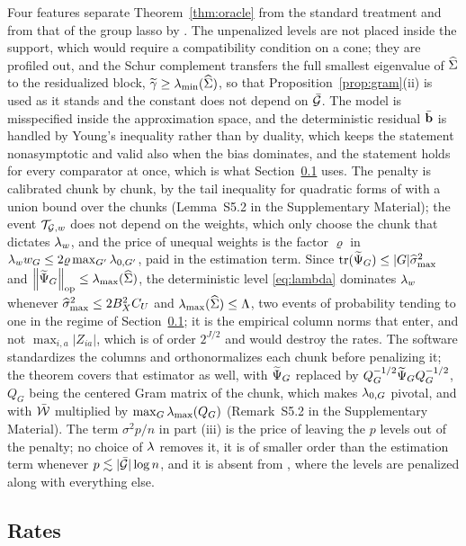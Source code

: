 Four features separate Theorem~\ref{thm:oracle} from the standard treatment
\citep[Chapter 6]{buhlmann2011statistics} and from that of the group
lasso by \citet{Lounici-Pontil-vandeGeer-Tsybakov-2011}. The unpenalized levels are not
placed inside the support, which would require a compatibility condition on a
cone; they are profiled out, and the Schur complement transfers the full
smallest eigenvalue of $\widehat{\Sigma}$ to the residualized block,
$\widetilde{\gamma} \ge \lambda_{\min}(\widehat{\Sigma})$, so that Proposition~\ref{prop:gram}(ii) is used
as it stands and the constant does not depend on $\bar{\mathcal{G}}$. The model is
misspecified inside the approximation space, and the deterministic residual $\bar{\mathbf{b}}$ is handled
by Young's inequality rather than by duality, which keeps the statement
nonasymptotic and valid also when the bias dominates, and the
statement holds for every comparator at once, which is what
Section~\ref{sec:rates} uses.  The penalty is calibrated chunk by
chunk, by the tail inequality for quadratic forms of
\citet[Theorem~2.1]{Hsu-Kakade-Zhang-2012} with a union bound over the chunks
(Lemma~S5.2 in the Supplementary Material); the event $\mathcal{T}_{\mathcal{G},w}$ does not depend on
the weights, which only choose the chunk that dictates $\lambda_{w}$, and the
price of unequal weights is the factor $\varrho$ in
$\lambda_{w}w_{G} \le 2\varrho\max_{G'}\lambda_{0,G'}$, paid in the estimation term.
Since $\mathrm{tr}(\widetilde{\Psi}_{G}) \le |G|\widehat{\sigma}_{\max}^{2}$ and
$\left\lVert \widetilde{\Psi}_{G} \right\rVert_{\mathrm{op}} \le \lambda_{\max}(\widehat{\Sigma})$, the deterministic level
\eqref{eq:lambda} dominates $\lambda_{w}$ whenever $\widehat{\sigma}_{\max}^{2} \le 2B_X^2C_U$ and
$\lambda_{\max}(\widehat{\Sigma}) \le \Lambda$, two events of probability tending to one in
the regime of Section~\ref{sec:rates}; it is the empirical column norms that
enter, and not $\max_{i,a}|Z_{ia}|$, which is of order $2^{J/2}$ and would
destroy the rates. The software standardizes the columns and orthonormalizes
each chunk before penalizing it; the theorem covers that estimator as well,
with $\widetilde{\Psi}_{G}$ replaced by $Q_{G}^{-1/2}\widetilde{\Psi}_{G}Q_{G}^{-1/2}$, $Q_{G}$
being the centered Gram matrix of the chunk, which makes $\lambda_{0,G}$ pivotal,
and with $\bar{\mathcal{W}}$ multiplied by $\max_{G}\lambda_{\max}(Q_{G})$ (Remark~S5.2 in the
Supplementary Material). The term $\sigma^{2}p/n$ in part (iii) is the price
of leaving the $p$ levels out of the penalty; no choice of $\lambda$ removes it,
it is of smaller order than the estimation term whenever
$p \lesssim |\bar{\mathcal{G}}|\log n$, and it is absent from
\citet{Klopp-Pensky-2015}, where the levels are penalized along with
everything else.

\subsection{Rates}
\label{sec:rates}


